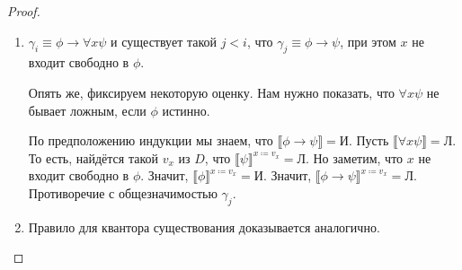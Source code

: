\begin{proof}
\begin{enumerate}
\item $\gamma_i \equiv \phi \rightarrow \forall{x}\psi$ и существует такой $j < i$, что
$\gamma_j \equiv \phi \rightarrow \psi$, при этом $x$ не входит свободно в $\phi$.

Опять же, фиксируем некоторую оценку.
Нам нужно показать, что $\forall{x}\psi$ не бывает ложным, если $\phi$ истинно.

По предположению индукции мы знаем, что $\llbracket \phi \rightarrow \psi \rrbracket = \texttt{И}$.
Пусть $\llbracket\forall{x}\psi\rrbracket = \texttt{Л}$. То есть, найдётся такой $v_x$ из $D$, что
$\llbracket \psi \rrbracket^{x\coloneqq v_x} = \texttt{Л}$. 
Но заметим, что $x$ не входит свободно в $\phi$. Значит, $\llbracket \phi \rrbracket^{x\coloneqq v_x} = \texttt{И}$.
Значит, $\llbracket\phi \rightarrow \psi\rrbracket^{x\coloneqq v_x} = \texttt{Л}$. Противоречие с общезначимостью $\gamma_j$.

\item Правило для квантора существования доказывается аналогично.

\end{enumerate}

\end{proof}
